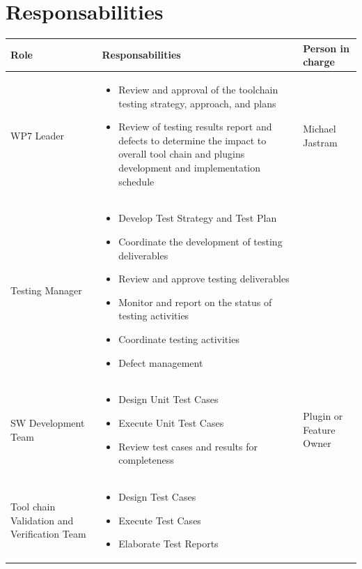 \section{Responsabilities}
\begin{center}
\begin{longtable}[H]{|p{3cm}|p{8cm}|p{4cm}|}\hline
\textbf{Role} & \textbf{Responsabilities} & \textbf{Person in charge}\\\hline
WP7 Leader & \begin{itemize}
\item Review and approval of the toolchain testing strategy, approach, and plans
\item Review of testing results report and defects to determine the impact to overall tool chain and plugins  development and implementation schedule
\end{itemize}  
 & Michael Jastram\\\hline
Testing Manager & \begin{itemize}
\item Develop Test Strategy and Test Plan
\item Coordinate the development of testing deliverables
\item Review and approve testing deliverables
\item Monitor and report on the status of testing activities
\item Coordinate testing activities
\item Defect management
\end{itemize}  
 & \\\hline
SW Development Team & \begin{itemize}
\item Design Unit Test Cases
\item Execute Unit Test Cases
\item Review test cases and results for completeness
\end{itemize}  & Plugin or Feature Owner\\\hline
Tool chain Validation and Verification Team & \begin{itemize}
\item Design Test Cases
\item Execute Test Cases
\item Elaborate Test Reports
\end{itemize}
& \\\hline
\end{longtable}
\end{center}


